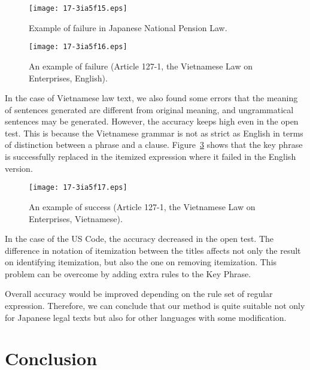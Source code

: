 \documentclass[english]{jnlp_1.4}
\begin{document}
\begin{figure}[b]
\begin{center}
\texttt{[image: 17-3ia5f15.eps]}
\end{center}
\caption{Example of failure in Japanese National Pension Law.}
\label{fig:err_japanese}
\end{figure}
\begin{figure}[b]
\begin{center}
\texttt{[image: 17-3ia5f16.eps]}
\end{center}
 \caption{An example of failure
(Article 127-1, the Vietnamese Law on Enterprises, English).}
 \label{fig:faileng}
\end{figure}

In the case of Vietnamese law text, we also found some errors that the meaning
of sentences generated are different from original meaning, and
ungrammatical sentences may be generated.
However, the accuracy keeps high even in the open test.
This is because the Vietnamese grammar is not as strict as English in terms
of distinction between a phrase and a clause.
Figure~\ref{fig:succviet} shows that the key phrase is successfully
replaced in the itemized expression where it failed in the English version.

\begin{figure}[t]
\begin{center}
\texttt{[image: 17-3ia5f17.eps]}
\end{center}
 \caption{An example of success
(Article 127-1, the Vietnamese Law on Enterprises, Vietnamese).}
 \label{fig:succviet}
\end{figure}

In the case of the US Code, the accuracy decreased in the open test.
The difference in notation of itemization between the titles affects not
only the result on identifying itemization, but also the one on removing itemization.
This problem can be overcome by adding extra rules to the Key Phrase.

Overall accuracy would be improved depending on the rule set of regular expression.
Therefore, we can conclude that our method is quite suitable not only for Japanese
legal texts but also for other languages with some modification.









\section{Conclusion}
\end{document}
